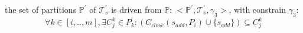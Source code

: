 the set of partitions $\mathbb{P}^{'}$ of $\mathcal{T}_{s}^{'}$ is driven from $\mathbb{P}$: $<\mathbb{P}^{'}, \mathcal{T}_{s}^{'}, \gamma_3>$, with constrain $\gamma_3$:
\begin{equation}
\label{eq:constrain_new_partition}
\forall k \in [i,..,m],\exists C_{j}^{k} \in P_{k}^{'}:(C_{close}(s_{add},P_{i}) \cup \{s_{add}\})\subseteq C_{j}^{k}  
\end{equation}


